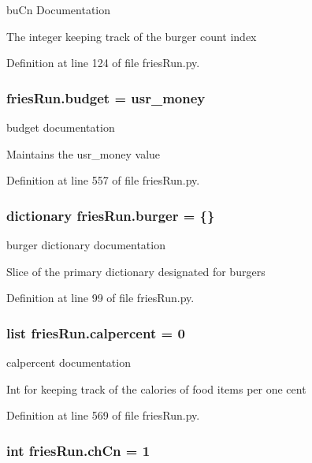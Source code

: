 bu\-Cn Documentation 

The integer keeping track of the burger count index 

Definition at line 124 of file fries\-Run.\-py.

\hypertarget{namespacefriesRun_ac928620e32dafcf55f413f9c6a70b5bb}{
\subsubsection[{budget}]{\setlength{\rightskip}{0pt plus 5cm}fries\-Run.\-budget = {\bf usr\-\_\-money}}}\label{namespacefriesRun_ac928620e32dafcf55f413f9c6a70b5bb}


budget documentation 

Maintains the usr\-\_\-money value 

Definition at line 557 of file fries\-Run.\-py.

\hypertarget{namespacefriesRun_a1d87c279ca1f01dcef99c76db1229704}{
\subsubsection[{burger}]{\setlength{\rightskip}{0pt plus 5cm}dictionary fries\-Run.\-burger = \{\}}}\label{namespacefriesRun_a1d87c279ca1f01dcef99c76db1229704}


burger dictionary documentation 

Slice of the primary dictionary designated for burgers 

Definition at line 99 of file fries\-Run.\-py.

\hypertarget{namespacefriesRun_aa749933552b8d76172e9f875a00bf9c0}{
\subsubsection[{calpercent}]{\setlength{\rightskip}{0pt plus 5cm}list fries\-Run.\-calpercent = 0}}\label{namespacefriesRun_aa749933552b8d76172e9f875a00bf9c0}


calpercent documentation 

Int for keeping track of the calories of food items per one cent 

Definition at line 569 of file fries\-Run.\-py.

\hypertarget{namespacefriesRun_ab39b0ce657d4141195cbc45a9bb633b5}{
\subsubsection[{ch\-Cn}]{\setlength{\rightskip}{0pt plus 5cm}int fries\-Run.\-ch\-Cn = 1}}\label{namespacefriesRun_ab39b0ce657d4141195cbc45a9bb633b5}


